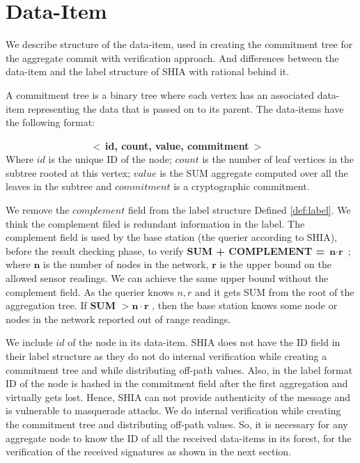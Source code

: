 \section{Data-Item}
	
	We describe structure of the data-item, used in creating the commitment tree for the aggregate commit with verification approach. And differences between the data-item and the label structure of SHIA with rational behind it.
	\begin{definition}
		\label{def:data-item}
		A commitment tree is a binary tree where each vertex has an associated data-item representing the data that is passed on to its parent. The data-items have the following format:

		$\hspace{100pt}$ \textbf{$<\ $id, count, value, commitment$\ >$}\\
	Where $id$ is the unique ID of the node; $count$ is the number of leaf vertices in the subtree rooted at this vertex; $value$ is the SUM aggregate computed over all the leaves in the subtree and $commitment$ is a cryptographic commitment.
	\end{definition}
	
	We remove the $complement$ field from the label structure Defined \ref{def:label}. 
	We think the complement filed is redundant information in the label. 
	The complement field is used by the base station (the querier according to SHIA), before the result checking phase, to verify \textbf{SUM + COMPLEMENT =} $\textbf{n} \cdot \textbf{r}$ ; where $\textbf{n}$ is the number of nodes in the network, $\textbf{r}$ is the upper bound on the allowed sensor readings.
	We can achieve the same upper bound without the complement field.
	As the querier knows $n, r$ and it gets SUM from the root of the aggregation tree.
	If \textbf{SUM} $> \textbf{n} \cdot \textbf{r}$ , then the base station knows some node or nodes in the network reported out of range readings.

	We include $id$ of the node in its data-item.
	SHIA does not have the ID field in their label structure as they do not do internal verification while creating a commitment tree and while distributing off-path values.
	Also, in the label format ID of the node is hashed in the commitment field after the first aggregation and virtually gets lost.
	Hence, SHIA can not provide authenticity of the message and is vulnerable to masquerade attacks.
	We do internal verification while creating the commitment tree and distributing off-path values.
	So, it is necessary for any aggregate node to know the ID of all the received data-items in its forest, for the verification of the received signatures as shown in the next section.

